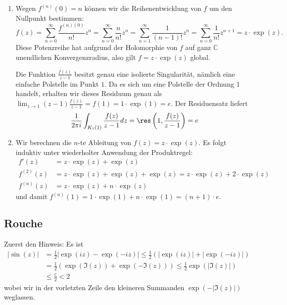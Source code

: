 \documentclass[a4paper]{article}
\begin{document}
\begin{enumerate}
	\item Wegen $f^{(n)}(0) = n$ können wir die Reihenentwicklung von $f$ um den Nullpunkt bestimmen:
	\begin{equation*}
		f(z) = \sum_{n = 0}^{\infty} \frac{f^{(n)(0)}}{n!} z^n = \sum_{n = 0}^{\infty} \frac{n}{n!} z^n = \sum_{n = 1}^{\infty} \frac{1}{(n-1)!} z^n = \sum_{n = 0}^{\infty} \frac{1}{n!} z^{n+1} = z \cdot \exp(z) \text{.}
	\end{equation*}
	Diese Potenzreihe hat aufgrund der Holomorphie von $f$ auf ganz $\mathds{C}$ unendlichen Konvergenzradius, also gilt $f = z \cdot \exp(z)$ global.

	Die Funktion $\frac{f(z)}{z - 1}$ besitzt genau eine isolierte Singularität, nämlich eine einfache Polstelle im Punkt $1$.
	Da es sich um eine Polstelle der Ordnung $1$ handelt, erhalten wir dieses Residuum genau als $\lim_{z \to 1} (z-1) \frac{f(z)}{z-1} = f(1) = 1 \cdot \exp(1) = e$.
	Der Residuensatz liefert
	\begin{equation*}
		\frac{1}{2 \pi i} \int_{K_1(1)} \frac{f(z)}{z-1} dz = \res\left( 1, \frac{f(z)}{z-1} \right) = e
	\end{equation*}
	\item Wir berechnen die $n$-te Ableitung von $f(z) = z \cdot \exp(z)$. Es folgt induktiv unter wiederholter Anwendung der Produktregel:
	\begin{align*}
		f'(z) &= z \cdot \exp(z) + \exp(z)\\
		f^{(2)}(z) &= z \cdot \exp(z) + \exp(z) + \exp(z) = z \cdot \exp(z) + 2 \cdot \exp(z)\\
		f^{(n)}(z) &= z \cdot \exp(z) + n \cdot \exp(z)
	\end{align*}
	und damit $f^{(n)}(1) = 1 \cdot \exp(1) + n \cdot \exp(1) = (n+1) \cdot e$.
\end{enumerate}

\subsection{Rouche}

Zuerst den Hinweis: Es ist
\begin{align*}
	|\sin(z)| &= \frac{1}{2} | \exp(iz) - \exp(-iz) | \leq \frac{1}{2} (|\exp(iz)| + |\exp(-iz)|)\\
	&= \frac{1}{2} (\exp(\Im(z)) + \exp(- \Im(z))) \leq \frac{1}{2} \exp(|\Im(z)|)\\ &\leq \frac{e}{2} < 2
\end{align*}
wobei wir in der vorletzten Zeile den kleineren Summanden $\exp(- |\Im(z)|)$ weglassen.
\end{document}
